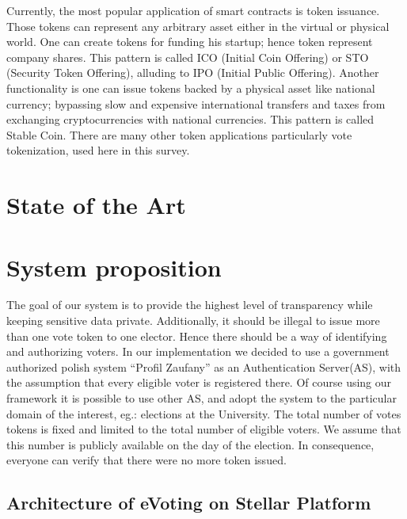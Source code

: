 \documentclass[runningheads]{llncs}
\begin{document}
Currently, the most popular application of smart contracts is token issuance. Those tokens can represent any arbitrary asset either in the virtual or physical world. One can create tokens for funding his startup; hence token represent company shares. This pattern is called ICO (Initial Coin Offering) or STO (Security Token Offering), alluding to IPO (Initial Public Offering). 
Another functionality is one can issue tokens backed by a physical asset like national currency; bypassing slow and expensive international transfers and taxes from exchanging cryptocurrencies with national currencies. This pattern is called Stable Coin. There are many other token applications particularly vote tokenization, used here in this survey.

\section{State of the Art}


\section{System proposition}
The goal of our system is to provide the highest level of transparency while keeping sensitive data private. Additionally, it should be illegal to issue more than one vote token to one elector. Hence there should be a way of identifying and authorizing voters. 
In our implementation we decided to use a government authorized polish system
“Profil Zaufany” as an Authentication Server(AS), with the assumption that every eligible voter is registered there. 
Of course using our framework it is possible to use other AS,
and adopt the system to the 
particular domain of the interest, 
eg.: elections at the University.
The total number of votes tokens is fixed and limited to the total number of eligible voters. We assume that this number is publicly available on the day of the election. In consequence, everyone can verify that there were no more token issued. 

\subsection{Architecture of eVoting on Stellar Platform}
\end{document}
